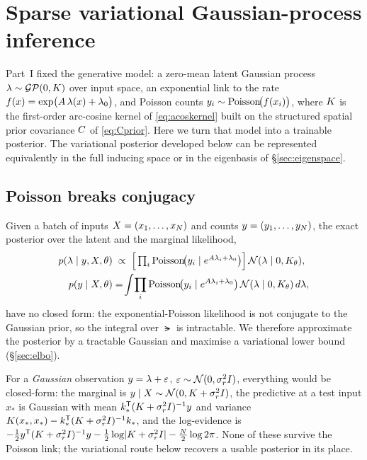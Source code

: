 
\section{Sparse variational Gaussian-process inference}\label{sec:varinf}

Part~I fixed the generative model: a zero-mean latent Gaussian process
$\lambda \sim \mathcal{GP}(0,K)$ over input space, an exponential link to the rate
$f(x)=\exp\!\big(A\,\lambda(x)+\lambda_{0}\big)$, and Poisson counts
$y_i \sim \mathrm{Poisson}\!\big(f(x_i)\big)$, where $K$ is the first-order
arc-cosine kernel of \eqref{eq:acoskernel} built on the structured spatial
prior covariance $C$ of \eqref{eq:Cprior}. Here we turn that model into a
trainable posterior. The variational posterior developed below can be
represented equivalently in the full inducing space or in the eigenbasis of
\S\ref{sec:eigenspace}.

\subsection{Poisson breaks conjugacy}\label{sec:conjugacy}

Given a batch of inputs $X=(x_1,\dots,x_{N})$ and counts
$y=(y_1,\dots,y_{N})$, the exact posterior over the latent and the
marginal likelihood,
\begin{align}
  p(\lambda\mid y,X,\theta)&\;\propto\;
    \Big[\textstyle\prod_i \mathrm{Poisson}\!\big(y_i\mid e^{A\lambda_i+\lambda_{0}}\big)\Big]\,
    \mathcal{N}(\lambda\mid 0,K_\theta), \notag\\
  p(y\mid X,\theta)&=\!\int\! \prod_i \mathrm{Poisson}\!\big(y_i\mid e^{A\lambda_i+\lambda_{0}}\big)\,
    \mathcal{N}(\lambda\mid 0,K_\theta)\,d\lambda ,
\end{align}
have no closed form: the exponential-Poisson likelihood is not conjugate to the
Gaussian prior, so the integral over $\lat$ is intractable. We therefore
approximate the posterior by a tractable Gaussian and maximise a variational
lower bound (\S\ref{sec:elbo}).

\begin{remark}
For a \emph{Gaussian} observation $y=\lambda+\varepsilon$,
$\varepsilon\sim\mathcal{N}(0,\sigma^{2}_r I)$, everything would be closed-form: the
marginal is $y\mid X\sim\mathcal{N}(0,K+\sigma^{2}_r I)$, the predictive at a test
input $x_\ast$ is Gaussian with mean $k_\ast^{\mathsf{T}}(K+\sigma^{2}_r I)^{-1}y$
and variance $K(x_\ast,x_\ast)-k_\ast^{\mathsf{T}}(K+\sigma^{2}_r I)^{-1}k_\ast$,
and the log-evidence is
$-\tfrac12y^{\mathsf{T}}(K+\sigma^{2}_r I)^{-1}y-\tfrac12\log\lvert K+\sigma^{2}_r I\rvert-\tfrac{N}{2}\log 2\pi$.
None of these survive the Poisson link; the variational route below recovers a
usable posterior in its place.
\end{remark}

